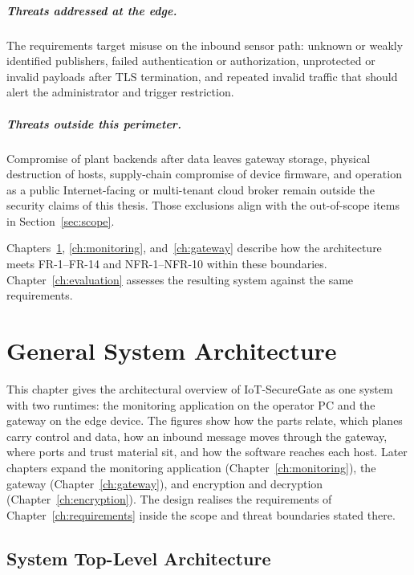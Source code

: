 \documentclass[12pt,a4paper]{report}
\begin{document}
\paragraph{Threats addressed at the edge.}
The requirements target misuse on the inbound sensor
path: unknown or weakly identified publishers, failed
authentication or authorization, unprotected or invalid
payloads after TLS termination, and repeated invalid
traffic that should alert the administrator and trigger
restriction.

\paragraph{Threats outside this perimeter.}
Compromise of plant backends after data leaves gateway
storage, physical destruction of hosts, supply-chain
compromise of device firmware, and operation as a public
Internet-facing or multi-tenant cloud broker remain
outside the security claims of this thesis. Those
exclusions align with the out-of-scope items in
Section~\ref{sec:scope}.

Chapters~\ref{ch:architecture}, \ref{ch:monitoring},
and~\ref{ch:gateway} describe how the architecture meets
FR-1--FR-14 and NFR-1--NFR-10 within these boundaries.
Chapter~\ref{ch:evaluation} assesses the resulting
system against the same requirements.

\chapter{General System Architecture}
\label{ch:architecture}

This chapter gives the architectural overview of
IoT-SecureGate as one system with two runtimes: the
monitoring application on the operator PC and the
gateway on the edge device. The figures show how the
parts relate, which planes carry control and data, how
an inbound message moves through the gateway, where
ports and trust material sit, and how the software
reaches each host. Later chapters expand the
monitoring application
(Chapter~\ref{ch:monitoring}), the gateway
(Chapter~\ref{ch:gateway}), and encryption and
decryption (Chapter~\ref{ch:encryption}). The design
realises the requirements of
Chapter~\ref{ch:requirements} inside the scope and
threat boundaries stated there.

\section{System Top-Level Architecture}
\label{sec:arch-toplevel}
\end{document}
